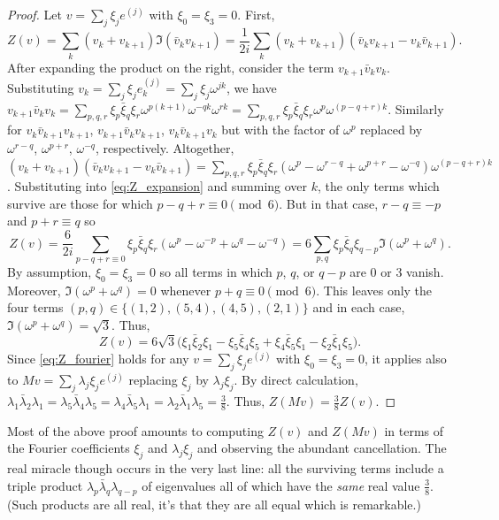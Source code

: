 \documentclass{amsart}
\theoremstyle{definition}
\begin{document}
\begin{proof}
    Let $v = \sum_j \xi_je^{(j)}$ with $\xi_0=\xi_3=0$. First, 
    \begin{equation}
        Z(v) = \sum_k (v_k+v_{k+1})\Im(\bar v_kv_{k+1}) = \frac1{2i}\sum_k(v_k+v_{k+1})(\bar v_kv_{k+1}-v_k\bar v_{k+1}).
        \label{eq:Z_expansion}
    \end{equation}
    After expanding the product on the right, consider the term $v_{k+1}\bar v_kv_k$. Substituting $v_k = \sum_j \xi_je^{(j)}_k = \sum_j \xi_j\omega^{jk}$, we have
    $
        v_{k+1}\bar v_kv_k
        = \sum_{p,q,r} \xi_p\bar\xi_q\xi_r\omega^{p(k+1)}\omega^{-qk}\omega^{rk}
        = \sum_{p,q,r} \xi_p\bar\xi_q\xi_r\omega^p\omega^{(p-q+r)k}.
    $
    Similarly for $v_k\bar v_{k+1}v_{k+1}$, $v_{k+1}\bar v_kv_{k+1}$, $v_k\bar v_{k+1}v_k$ but with the factor of $\omega^p$ replaced by $\omega^{r-q}$, $\omega^{p+r}$, $\omega^{-q}$, respectively. Altogether, $(v_k+v_{k+1})(\bar v_kv_{k+1}-v_k\bar v_{k+1}) = \sum_{p,q,r} \xi_p\bar\xi_q\xi_r(\omega^p-\omega^{r-q}+\omega^{p+r}-\omega^{-q})\omega^{(p-q+r)k}$.
    Substituting into \eqref{eq:Z_expansion} and summing over $k$, the only terms which survive are those for which $p-q+r \equiv 0 \pmod 6$. But in that case, $r-q\equiv -p$ and $p+r\equiv q$ so
    \[
        Z(v) 
        = \frac{6}{2i}\sum_{p-q+r\equiv 0} \xi_p\bar\xi_q\xi_r(\omega^p-\omega^{-p}+\omega^q-\omega^{-q})
        = 6\sum_{p,q} \xi_p\bar\xi_q\xi_{q-p}\Im(\omega^p+\omega^q).
    \]
    By assumption, $\xi_0=\xi_3 = 0$ so all terms in which $p$, $q$, or $q-p$ are $0$ or $3$ vanish. Moreover, $\Im(\omega^p+\omega^q)=0$ whenever $p+q\equiv0\pmod 6$. This leaves only the four terms $(p,q) \in \{(1,2),(5,4),(4,5),(2,1)\}$ and in each case, $\Im(\omega^p+\omega^q)=\sqrt{3}$. Thus,
    \begin{equation}
        Z(v)
        = 6\sqrt 3\big( \xi_1\bar\xi_2\xi_1-\xi_5\bar\xi_4\xi_5 + \xi_4\bar\xi_5\xi_1 - \xi_2\bar\xi_1\xi_5 \big).
        \label{eq:Z_fourier}
    \end{equation}
    Since \eqref{eq:Z_fourier} holds for any $v = \sum_j\xi_je^{(j)}$ with $\xi_0=\xi_3=0$, it applies also to $Mv = \sum_j\lambda_j\xi_je^{(j)}$ replacing $\xi_j$ by $\lambda_j\xi_j$. By direct calculation, $\lambda_1\bar\lambda_2\lambda_1 = \lambda_5\bar\lambda_4\lambda_5 = \lambda_4\bar\lambda_5\lambda_1 = \lambda_2\bar\lambda_1\lambda_5 = \frac38$. Thus, $Z(Mv) = \frac38Z(v)$. 
\end{proof}

Most of the above proof amounts to computing $Z(v)$ and $Z(Mv)$ in terms of the Fourier coefficients $\xi_j$ and $\lambda_j\xi_j$ and observing the abundant cancellation. The real miracle though occurs in the very last line: all the surviving terms include a triple product $\lambda_p\bar\lambda_q\lambda_{q-p}$ of eigenvalues all of which have the \emph{same} real value $\frac38$. (Such products are all real, it's that they are all equal which is remarkable.)
\end{document}
